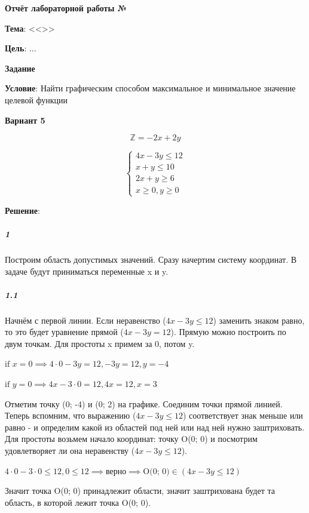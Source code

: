 \begin{center}
  \textbf{Отчёт лабораторной работы №\envReportLabNumber}
\end{center}

\textbf{Тема}:
<<\envReportTitle>>

\textbf{Цель}: ...


\begin{center}
  \textbf{Задание}
\end{center}

\textbf{Условие}:
Найти графическим способом максимальное и минимальное значение целевой функции

\begin{center}
  \textbf{Вариант 5}
\end{center}

$$
\mathbb{Z} = -2 x +2 y
$$

$$
\begin{cases}
  4x - 3 y  \leq 12\\
  x + y \leq 10 \\
  2 x + y \geq 6\\
  x \geq 0, y \geq 0
\end{cases}
$$

\textbf{Решение}:

\subparagraph{1}
Построим область допустимых значений.
Сразу начертим систему координат.
В задаче будут приниматься переменные x и y.

\subparagraph{1.1}
Начнём с первой линии.
Если неравенство ($4x - 3 y  \leq 12$) заменить знаком равно, то это будет уравнение прямой ($4x - 3 y  = 12$).
Прямую можно построить по двум точкам.
Для простоты x примем за 0, потом y.

$
\text{if } x = 0 \implies 4 \cdot 0 - 3 y = 12, -3y = 12, y=-4
$

$
\text{if } y = 0 \implies 4 x - 3 \cdot 0 = 12, 4x=12, x=3
$

Отметим точку (0; -4) и (0; 2) на графике.
Соединим точки прямой линией.
Теперь вспомним, что выражению ($4x - 3 y  \leq 12$) соответствует знак меньше или равно
- и определим какой из областей под ней или над ней нужно заштриховать.
Для простоты возьмем начало координат: точку O(0; 0)
и посмотрим удовлетворяет ли она неравенству ($4x - 3 y  \leq 12$).

$
4 \cdot 0 - 3 \cdot 0  \leq 12, 0 \leq 12 \implies \text{верно} \implies \text{O(0; 0)} \in (4x-3y\leq 12)
$

Значит точка O(0; 0) принадлежит области, значит заштрихована будет та область, в которой лежит точка O(0; 0).

